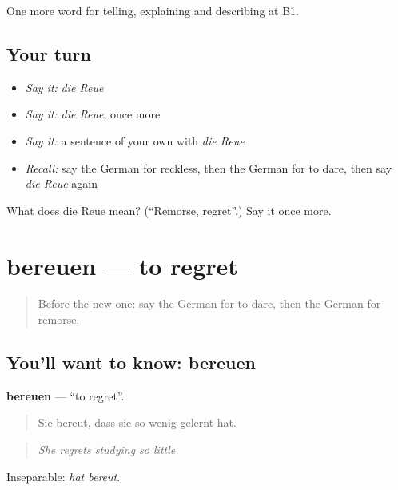 \begin{grammarlens}[title={What you've built}]
One more word for telling, explaining and describing at B1.
\end{grammarlens}

\subsection*{Your turn}
\begin{itemize}
\raggedright
  \item \emph{Say it:} \emph{die Reue}
  \item \emph{Say it:} \emph{die Reue}, once more
  \item \emph{Say it:} a sentence of your own with \emph{die Reue}
  \item \emph{Recall:} say the German for reckless, then the German for to dare, then say \emph{die Reue} again
\end{itemize}

\begin{tcolorbox}[breakable,colback=teal!4,colframe=teal!35!black,title={Before you move on}]
What does die Reue mean? (\textquotedblleft{}Remorse, regret\textquotedblright{}.) Say it once more.
\end{tcolorbox}
\section[bereuen]{bereuen — to regret}

\label{lesson:GE-C478-bereuen}



\begin{quote}
Before the new one: say the German for to dare, then the German for remorse.
\end{quote}

\subsection*{You'll want to know: bereuen}
\textbf{bereuen} — \textquotedblleft{}to regret\textquotedblright{}.

\begin{quote}
Sie bereut, dass sie so wenig gelernt hat.
\end{quote}

\begin{quote}
\emph{She regrets studying so little.}
\end{quote}

Inseparable: \emph{hat bereut}.


